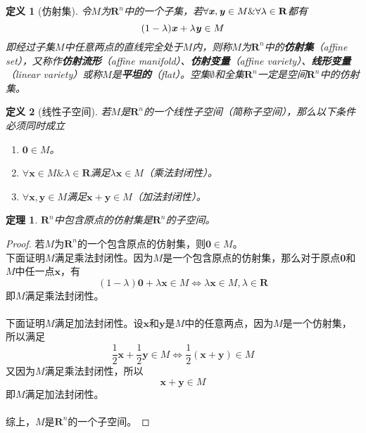 \documentclass[a4paper,11pt,oneside]{article}
\newtheorem{definition}{定义}[section]
\newtheorem{theorem}{定理}[section]
\newtheorem{proof}{证明}[section]
\begin{document}
			\begin{definition}[仿射集]
				\label{def:5}
				令$M$为$\textbf{R}^{n}$中的一个子集，若$\forall \textbf{\textit{x}}, \textbf{\textit{y}} \in M \& \forall \lambda \in \textbf{R}$都有
				$$(1-\lambda)\textbf{\textit{x}}+\lambda\textbf{\textit{y}} \in M$$
				即经过子集$M$中任意两点的直线完全处于$M$内，则称$M$为$\textbf{R}^{n}$中的\textbf{仿射集}（affine set），又称作\textbf{仿射流形}（affine manifold）、\textbf{仿射变量}（affine variety）、\textbf{线形变量}（linear variety）或称$M$是\textbf{平坦的}（flat）。空集$\emptyset$和全集$\textbf{R}^{n}$一定是空间$\textbf{R}^{n}$中的仿射集。
			\end{definition}
			\begin{definition}[线性子空间]
				若$M$是$\textbf{R}^{n}$的一个线性子空间（简称子空间），那么以下条件必须同时成立
				\begin{enumerate}
					\item $\textbf{0} \in M$。
					\item $\forall \textbf{x} \in M \& \lambda \in \textbf{R}$满足$\lambda \textbf{x} \in M$（乘法封闭性）。
					\item $\forall \textbf{x},\textbf{y} \in M$满足$\textbf{x}+\textbf{y} \in M$（加法封闭性）。
				\end{enumerate}
			\end{definition}
			\begin{theorem}
				\label{the:theorem1}
				$\textbf{R}^{n}$中包含原点的仿射集是$\textbf{R}^{n}$的子空间。
			\end{theorem}
			\begin{proof}
				若$M$为$\textbf{R}^{n}$的一个包含原点的仿射集，则$\textbf{0} \in M$。\\
				下面证明$M$满足乘法封闭性。因为$M$是一个包含原点的仿射集，那么对于原点$\textbf{0}$和$M$中任一点$\textbf{x}$，有
				$$(1-\lambda)\textbf{0}+\lambda \textbf{x} \in M \Leftrightarrow \lambda \textbf{x} \in M, \lambda \in \textbf{R}$$
				即$M$满足乘法封闭性。\\
				\\
				下面证明$M$满足加法封闭性。设$\textbf{x}$和$\textbf{y}$是$M$中的任意两点，因为$M$是一个仿射集，所以满足
				$$\frac{1}{2} \textbf{x} + \frac{1}{2} \textbf{y} \in M \Leftrightarrow \frac{1}{2} (\textbf{x} + \textbf{y}) \in M$$
				又因为$M$满足乘法封闭性，所以
				$$\textbf{x} + \textbf{y} \in M$$
				即$M$满足加法封闭性。\\
				\\
				综上，$M$是$\textbf{R}^{n}$的一个子空间。
			\end{proof}
\end{document}
